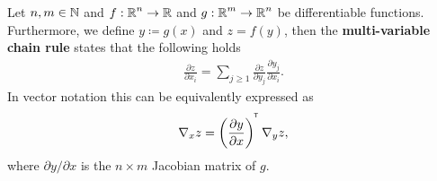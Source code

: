 \begin{theorem}\label{theorem:multi_var_chainrule}
Let $n,m\in\operatorname{\mathbb{N}}$ and $f:\operatorname{\mathbb{R}}^{n} \to \operatorname{\mathbb{R}}$ and $g:\operatorname{\mathbb{R}}^{m} \to \operatorname{\mathbb{R}}^{n}$ be differentiable functions. Furthermore, we define $y \coloneqq g(x)$ and $z=f(y)$, then the \textbf{multi-variable chain rule} states that the following holds
\begin{align*}
\frac{\partial z}{\partial x_i} = \sum_{j\geq 1} \frac{\partial z}{\partial y_j} \frac{\partial y_j}{\partial x_i}.
\end{align*}
In vector notation this can be equivalently expressed as
\begin{align*}
\nabla_x z = \left( \frac{\partial y}{\partial x} \right)^{^{\mkern-1.5mu\mathsf{T}}} \nabla_{y} z,
\end{align*}
where $\partial y/\partial x$ is the $n\times m$ Jacobian matrix of $g$.
\end{theorem}


